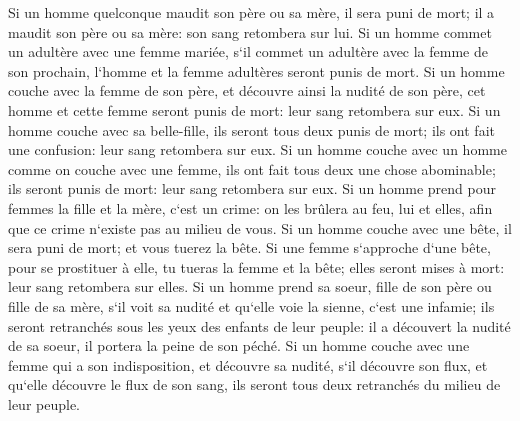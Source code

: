 \verse Si un homme quelconque maudit son père ou sa mère, il sera puni de mort; il a maudit son père ou sa mère: son sang retombera sur lui. 
\verse Si un homme commet un adultère avec une femme mariée, s`il commet un adultère avec la femme de son prochain, l`homme et la femme adultères seront punis de mort. 
\verse Si un homme couche avec la femme de son père, et découvre ainsi la nudité de son père, cet homme et cette femme seront punis de mort: leur sang retombera sur eux. 
\verse Si un homme couche avec sa belle-fille, ils seront tous deux punis de mort; ils ont fait une confusion: leur sang retombera sur eux. 
\verse Si un homme couche avec un homme comme on couche avec une femme, ils ont fait tous deux une chose abominable; ils seront punis de mort: leur sang retombera sur eux. 
\verse Si un homme prend pour femmes la fille et la mère, c`est un crime: on les brûlera au feu, lui et elles, afin que ce crime n`existe pas au milieu de vous. 
\verse Si un homme couche avec une bête, il sera puni de mort; et vous tuerez la bête. 
\verse Si une femme s`approche d`une bête, pour se prostituer à elle, tu tueras la femme et la bête; elles seront mises à mort: leur sang retombera sur elles. 
\verse Si un homme prend sa soeur, fille de son père ou fille de sa mère, s`il voit sa nudité et qu`elle voie la sienne, c`est une infamie; ils seront retranchés sous les yeux des enfants de leur peuple: il a découvert la nudité de sa soeur, il portera la peine de son péché. 
\verse Si un homme couche avec une femme qui a son indisposition, et découvre sa nudité, s`il découvre son flux, et qu`elle découvre le flux de son sang, ils seront tous deux retranchés du milieu de leur peuple. 

